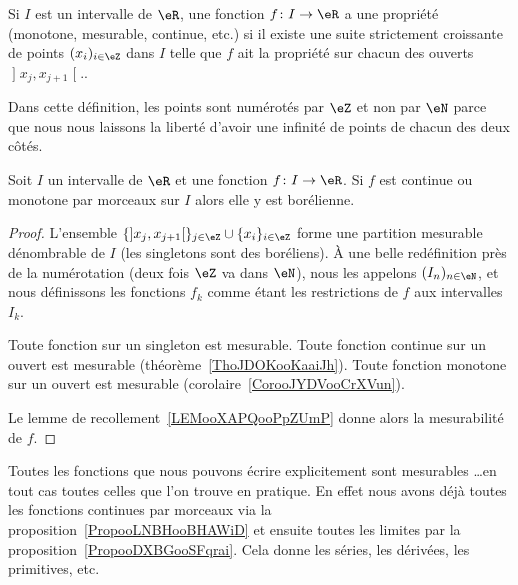 \begin{definition}
	Si \( I\) est un intervalle de \( \eR\), une fonction \( f\colon I\to \eR\) a une propriété (monotone, mesurable, continue, etc.)  si il existe une suite strictement croissante de points \( (x_i)_{i\in \eZ}\) dans \( I\) telle que \( f\) ait la propriété sur chacun des ouverts \( \mathopen] x_j ,x_{j+1} \mathclose[.\).
\end{definition}
Dans cette définition, les points sont numérotés par \( \eZ\) et non par \( \eN\) parce que nous nous laissons la liberté d'avoir une infinité de points de chacun des deux côtés.

\begin{proposition}     \label{PropooLNBHooBHAWiD}
	Soit \( I\) un intervalle de \( \eR\) et une fonction \( f\colon I\to \eR\). Si \( f\) est continue ou monotone par morceaux sur \( I\) alors elle y est borélienne.
\end{proposition}

\begin{proof}
	L'ensemble \( \{  \mathopen] x_j , x_{j+1} \mathclose[  \}_{j\in \eZ}\cup\{ x_i \}_{i\in \eZ}\) forme une partition mesurable dénombrable de \( I\) (les singletons sont des boréliens). À une belle redéfinition près de la numérotation (deux fois \( \eZ\) va dans \( \eN\)), nous les appelons \( (I_n)_{n\in \eN}\), et nous définissons les fonctions \( f_k\) comme étant les restrictions de \( f\) aux intervalles \( I_k\).

	Toute fonction sur un singleton est mesurable. Toute fonction continue sur un ouvert est mesurable (théorème~\ref{ThoJDOKooKaaiJh}). Toute fonction monotone sur un ouvert est mesurable (corolaire~\ref{CorooJYDVooCrXVun}).

	Le lemme de recollement~\ref{LEMooXAPQooPpZUmP} donne alors la mesurabilité de \( f\).
\end{proof}

\begin{normaltext}
	Toutes les fonctions que nous pouvons écrire explicitement sont mesurables \ldots en tout cas toutes celles que l'on trouve en pratique. En effet nous avons déjà toutes les fonctions continues par morceaux via la proposition~\ref{PropooLNBHooBHAWiD} et ensuite toutes les limites par la proposition~\ref{PropooDXBGooSFqrai}. Cela donne les séries, les dérivées, les primitives, etc.
\end{normaltext}
